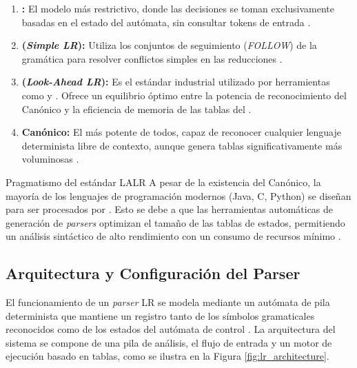 \begin{enumerate}
    \item \textbf{:} El modelo más restrictivo, donde las decisiones se toman exclusivamente basadas en el estado del autómata, sin consultar tokens de entrada \cite{aho2006compilers}.
    \item \textbf{ (\textit{Simple LR}):} Utiliza los conjuntos de seguimiento (\textit{FOLLOW}) de la gramática para resolver conflictos simples en las reducciones \cite{aho2006compilers}.
    \item \textbf{ (\textit{Look-Ahead LR}):} Es el estándar industrial utilizado por herramientas como  y . Ofrece un equilibrio óptimo entre la potencia de reconocimiento del  Canónico y la eficiencia de memoria de las tablas del  \cite{aho2006compilers}.
    \item \textbf{ Canónico:} El más potente de todos, capaz de reconocer cualquier lenguaje determinista libre de contexto, aunque genera tablas significativamente más voluminosas \cite{sipser2012introduction,aho2006compilers}.
\end{enumerate}

\begin{observacion}{Pragmatismo del estándar LALR}
A pesar de la existencia del  Canónico, la mayoría de los lenguajes de programación modernos (Java, C, Python) se diseñan para ser procesados por . Esto se debe a que las herramientas automáticas de generación de \textit{parsers} optimizan el tamaño de las tablas de estados, permitiendo un análisis sintáctico de alto rendimiento con un consumo de recursos mínimo \cite{aho2006compilers}.
\end{observacion}

\subsection{Arquitectura y Configuración del Parser}
\label{subsec:3_6_3_arquitectura}

El funcionamiento de un \textit{parser} LR se modela mediante un autómata de pila determinista que mantiene un registro tanto de los símbolos gramaticales reconocidos como de los estados del autómata de control \cite{aho2006compilers}. La arquitectura del sistema se compone de una pila de análisis, el flujo de entrada y un motor de ejecución basado en tablas, como se ilustra en la Figura \ref{fig:lr_architecture}.

